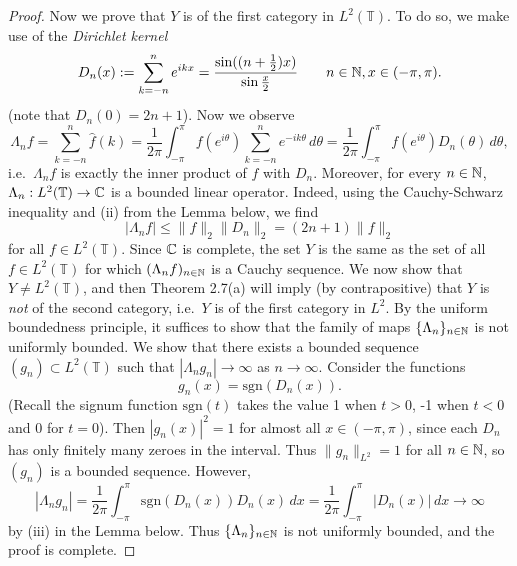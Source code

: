 \begin{proof}
	Now we prove that $Y$ is of the first category in $L^2(\mathbb{T})$. To do so, we make use of the \emph{Dirichlet kernel}
	\begin{equation*}
		D_n(x) := \sum_{k=-n}^n e^{ikx} = \frac{\sin ((n+\tfrac{1}{2})x)}{\sin \tfrac{x}{2}} \qquad n \in \mathbb{N}, x \in (-\pi,\pi).
	\end{equation*}
	(note that $D_n(0) = 2n+1$). Now we observe
	\begin{equation*}
		\Lambda_n f = \sum_{k=-n}^n \hat{f}(k) = \frac{1}{2\pi} \int_{-\pi}^\pi f(e^{i\theta}) \sum_{k=-n}^n e^{-ik\theta} \,d\theta = \frac{1}{2\pi}\int_{-\pi}^\pi f(e^{i\theta}) D_n(\theta) \,d\theta,
	\end{equation*}
	i.e.\ $\Lambda_n f$ is exactly the inner product of $f$ with $D_n$. Moreover, for every $n\in \mathbb{N}$, $\Lambda_n : L^2(\mathbb{T}) \to \mathbb{C}$ is a bounded linear operator. Indeed, using the Cauchy-Schwarz inequality and (ii) from the Lemma below, we find
	\begin{equation*}
		|\Lambda_n f| \le \|f\|_2 \|D_n\|_2 = (2n+1)\|f\|_2
	\end{equation*}
	for all $f \in L^2(\mathbb{T})$. Since $\mathbb{C}$ is complete, the set $Y$ is the same as the set of all $f \in L^2(\mathbb{T})$ for which $(\Lambda_n f)_{n\in\mathbb{N}}$ is a Cauchy sequence. We now show that $Y \ne L^2(\mathbb{T})$, and then Theorem 2.7(a) will imply (by contrapositive) that $Y$ is \emph{not} of the second category, i.e.\ $Y$ is of the first category in $L^2$. By the uniform boundedness principle, it suffices to show that the family of maps $\{\Lambda_n\}_{n \in \mathbb{N}}$ is not uniformly bounded. We show that there exists a bounded sequence $(g_n) \subset L^2(\mathbb{T})$ such that $|\Lambda_n g_n| \to \infty$ as $n\to\infty$. Consider the functions
	\begin{equation*}
		g_n(x) = \text{sgn}(D_n(x)).
	\end{equation*}
	(Recall the signum function $\text{sgn}(t)$ takes the value 1 when $t>0$, -1 when $t<0$ and 0 for $t=0$). Then $|g_n(x)|^2 = 1$ for almost all $x\in(-\pi,\pi)$, since each $D_n$ has only finitely many zeroes in the interval. Thus $\|g_n\|_{L^2} = 1$ for all $n\in\mathbb{N}$, so $(g_n)$ is a bounded sequence. However,
	\begin{equation*}
		|\Lambda_n g_n| = \frac{1}{2\pi}\int_{-\pi}^\pi \text{sgn}(D_n(x))D_n(x) \,dx = \frac{1}{2\pi}\int_{-\pi}^\pi |D_n(x)|\,dx \to \infty
	\end{equation*}
	by (iii) in the Lemma below. Thus $\{\Lambda_n\}_{n\in\mathbb{N}}$ is not uniformly bounded, and the proof is complete.
\end{proof}

